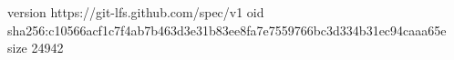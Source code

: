 version https://git-lfs.github.com/spec/v1
oid sha256:c10566acf1c7f4ab7b463d3e31b83ee8fa7e7559766bc3d334b31ec94caaa65e
size 24942
